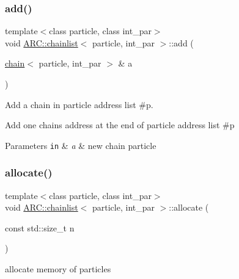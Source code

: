 \subsubsection{\texorpdfstring{add()}{add()}\hspace{0.1cm}{\footnotesize\ttfamily [3/3]}}
{\footnotesize\ttfamily template$<$class particle, class int\+\_\+par$>$ \\
void \hyperlink{classARC_1_1chainlist}{A\+R\+C\+::chainlist}$<$ particle, int\+\_\+par $>$\+::add (\begin{DoxyParamCaption}\item[{\hyperlink{classARC_1_1chain}{chain}$<$ particle, int\+\_\+par $>$ \&}]{a }\end{DoxyParamCaption})\hspace{0.3cm}{\ttfamily [inline]}}



Add a chain in particle address list \#p. 

Add one chain\textquotesingle{}s address at the end of particle address list \#p 
\begin{DoxyParams}[1]{Parameters}
\mbox{\tt in}  & {\em a} & new chain particle \\
\hline
\end{DoxyParams}
\hypertarget{classARC_1_1chainlist_a79dfad1e9aeafcee55a28983f8eaffbe}{}\label{classARC_1_1chainlist_a79dfad1e9aeafcee55a28983f8eaffbe} 
\subsubsection{\texorpdfstring{allocate()}{allocate()}}
{\footnotesize\ttfamily template$<$class particle, class int\+\_\+par$>$ \\
void \hyperlink{classARC_1_1chainlist}{A\+R\+C\+::chainlist}$<$ particle, int\+\_\+par $>$\+::allocate (\begin{DoxyParamCaption}\item[{const std\+::size\+\_\+t}]{n }\end{DoxyParamCaption})\hspace{0.3cm}{\ttfamily [inline]}}



allocate memory of particles 

